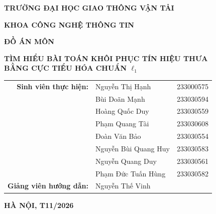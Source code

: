 \begin{titlepage}
    \drawcoverborder
    \centering
    \vspace*{-0.8cm}

    {\fontsize{13pt}{16pt}\selectfont\bfseries TRƯỜNG ĐẠI HỌC GIAO THÔNG VẬN TẢI\par}
    \vspace{0.1cm}
    {\fontsize{13pt}{16pt}\selectfont\bfseries KHOA CÔNG NGHỆ THÔNG TIN\par}
    
    \vspace{1.6cm}

    {\fontsize{16pt}{20pt}\selectfont\bfseries ĐỒ ÁN MÔN\par}
    \vspace{0.5cm}

    {\fontsize{14pt}{19pt}\selectfont\bfseries TÌM HIỂU BÀI TOÁN KHÔI PHỤC TÍN HIỆU THƯA\\BẰNG CỰC TIỂU HÓA CHUẨN $\ell_1$\par}

    \vspace{1.2cm}

    \begin{flushleft}
        \hspace*{1.0cm}
        \begin{tabular}{rll}
            \textbf{Sinh viên thực hiện:} 
            & Nguyễn Thị Hạnh      & \hspace{0.6cm} 233000575 \\[0.18cm]
            & Bùi Doãn Mạnh        & \hspace{0.6cm} 233030594 \\[0.18cm]
            & Hoàng Quốc Duy       & \hspace{0.6cm} 233030559 \\[0.18cm]
            & Phạm Quang Tài       & \hspace{0.6cm} 233030608 \\[0.18cm]
            & Đoàn Văn Bảo         & \hspace{0.6cm} 233030554 \\[0.18cm]
            & Nguyễn Bùi Quang Huy & \hspace{0.6cm} 233030583 \\[0.18cm]
            & Nguyễn Quang Duy     & \hspace{0.6cm} 233030561 \\[0.18cm]
            & Phạm Đức Tuấn Hùng   & \hspace{0.6cm} 233030582 \\[0.50cm]
            \textbf{Giảng viên hướng dẫn:} 
            & \multicolumn{2}{l}{Nguyễn Thế Vinh}
        \end{tabular}
    \end{flushleft}

    \vfill
    {\fontsize{12pt}{15pt}\selectfont\bfseries HÀ NỘI, T11/2026\par}
    \vspace*{0.6cm}
\end{titlepage}
